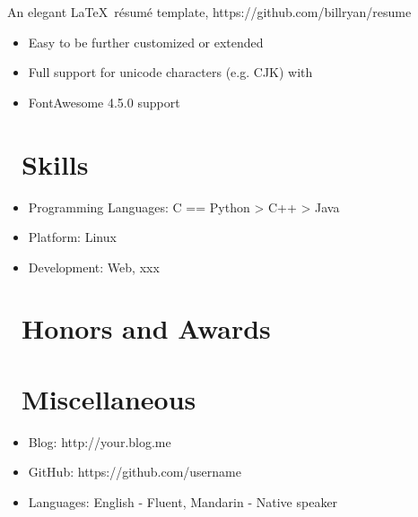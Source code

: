 \documentclass{resume}
\begin{document}
An elegant \LaTeX\ résumé template, https://github.com/billryan/resume
\begin{itemize}
  \item Easy to be further customized or extended
  \item Full support for unicode characters (e.g. CJK) with \XeLaTeX\
  \item FontAwesome 4.5.0 support
\end{itemize}


\section{\faCogs\ Skills}
\begin{itemize}[parsep=0.5ex]
  \item Programming Languages: C == Python > C++ > Java
  \item Platform: Linux
  \item Development: Web, xxx
\end{itemize}

\section{\faHeartO\ Honors and Awards}

\section{\faInfo\ Miscellaneous}
\begin{itemize}[parsep=0.5ex]
  \item Blog: http://your.blog.me
  \item GitHub: https://github.com/username
  \item Languages: English - Fluent, Mandarin - Native speaker
\end{itemize}

%
%
\end{document}
